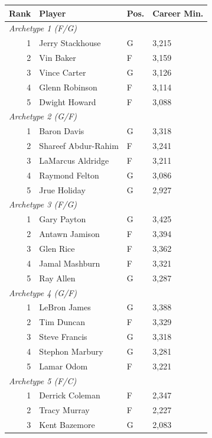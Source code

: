 \begin{table}[htbp]
  \centering\small
  \begin{tabular}{rlll}
    \toprule
    Rank & Player & Pos. & Career Min. \\
    \midrule
    \multicolumn{4}{l}{\textit{Archetype 1 (F/G)}} \\
    \midrule
    1 & Jerry Stackhouse & G & 3,215 \\
    2 & Vin Baker & F & 3,159 \\
    3 & Vince Carter & G & 3,126 \\
    4 & Glenn Robinson & F & 3,114 \\
    5 & Dwight Howard & F & 3,088 \\
    \midrule[0.4pt]
    \multicolumn{4}{l}{\textit{Archetype 2 (G/F)}} \\
    \midrule
    1 & Baron Davis & G & 3,318 \\
    2 & Shareef Abdur-Rahim & F & 3,241 \\
    3 & LaMarcus Aldridge & F & 3,211 \\
    4 & Raymond Felton & G & 3,086 \\
    5 & Jrue Holiday & G & 2,927 \\
    \midrule[0.4pt]
    \multicolumn{4}{l}{\textit{Archetype 3 (F/G)}} \\
    \midrule
    1 & Gary Payton & G & 3,425 \\
    2 & Antawn Jamison & F & 3,394 \\
    3 & Glen Rice & F & 3,362 \\
    4 & Jamal Mashburn & F & 3,321 \\
    5 & Ray Allen & G & 3,287 \\
    \midrule[0.4pt]
    \multicolumn{4}{l}{\textit{Archetype 4 (G/F)}} \\
    \midrule
    1 & LeBron James & G & 3,388 \\
    2 & Tim Duncan & F & 3,329 \\
    3 & Steve Francis & G & 3,318 \\
    4 & Stephon Marbury & G & 3,281 \\
    5 & Lamar Odom & F & 3,221 \\
    \midrule[0.4pt]
    \multicolumn{4}{l}{\textit{Archetype 5 (F/C)}} \\
    \midrule
    1 & Derrick Coleman & F & 2,347 \\
    2 & Tracy Murray & F & 2,227 \\
    3 & Kent Bazemore & G & 2,083 \\

\end{tabular}
\end{table}
